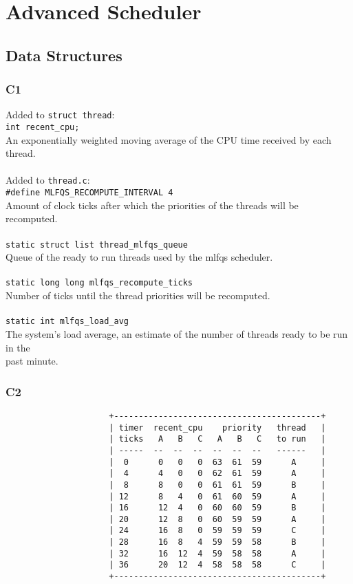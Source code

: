\documentclass[a4wide, 11pt]{article}
\newcommand{\tab}{\hspace*{2em}}
\newcommand{\tx}{\texttt}
\begin{document}
\section{Advanced Scheduler}
\subsection{Data Structures}
\subsubsection{C1}

Added to \tx{struct thread}: \\
\tab\tab \tx{int recent\_cpu;} \\
\tab\tab An exponentially weighted moving average of the CPU time received by each thread.
\\\\
Added to \tx{thread.c}: \\
\tab\tab \tx{\#define MLFQS\_RECOMPUTE\_INTERVAL 4} \\
\tab\tab Amount of clock ticks after which the priorities of the threads will be recomputed.
\\\\
\tab\tab \tx{static struct list thread\_mlfqs\_queue}\\
\tab\tab Queue of the ready to run threads used by the mlfqs scheduler.
\\\\
\tab\tab \tx{static long long mlfqs\_recompute\_ticks} \\
\tab\tab Number of ticks until the thread priorities will be recomputed.
\\\\
\tab\tab \tx{static int mlfqs\_load\_avg}\\
\tab\tab The system's load average, an estimate of the number of threads ready to be run in the \\
\tab\tab past minute.
\newpage
\subsubsection{C2}
\begin{verbatim}     
                     +------------------------------------------+
                     | timer  recent_cpu    priority   thread   | 
                     | ticks   A   B   C   A   B   C   to run   |  
                     | -----  --  --  --  --  --  --   ------   |  
                     |  0      0   0   0  63  61  59      A     |
                     |  4      4   0   0  62  61  59      A     |  
                     |  8      8   0   0  61  61  59      B     |
                     | 12      8   4   0  61  60  59      A     |
                     | 16      12  4   0  60  60  59      B     |
                     | 20      12  8   0  60  59  59      A     |     
                     | 24      16  8   0  59  59  59      C     |
                     | 28      16  8   4  59  59  58      B     | 
                     | 32      16  12  4  59  58  58      A     |        
                     | 36      20  12  4  58  58  58      C     |
                     +------------------------------------------+
\end{verbatim}
\end{document}
